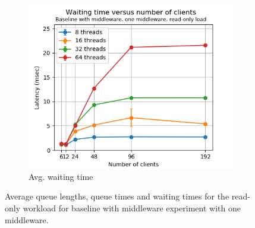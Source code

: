 \documentclass[11pt,a4paper]{article}
\begin{document}
\begin{figure}[h]
\begin{subfigure}{.33\textwidth}
\end{subfigure}%
\begin{subfigure}{.33\textwidth}
  \centering
  \includegraphics[width=1.0\linewidth,trim={0px 0px 0px 0px},clip]{img/plot/mwb1-ro-wtime-mini.png}
  \caption{Avg. waiting time}
  \label{fig:mwb1-ro-wtime-mini}
\end{subfigure}
\caption{Average queue lengths, queue times and waiting times for the read-only workload for baseline with middleware experiment with one middleware.}
\label{fig:mwb1-ro-mini}
\end{figure}
\end{document}
